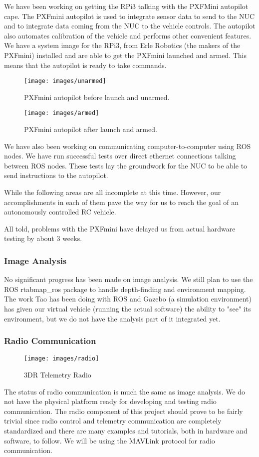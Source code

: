 \documentclass[compsoc,draftclsnofoot,onecolumn,10pt]{IEEEtran}
\begin{document}
We have been working on getting the RPi3 talking with the PXFMini autopilot cape. The PXFmini autopilot is used to integrate sensor data to send to the NUC and to integrate data coming from the NUC to the vehicle controls. The autopilot also automates calibration of the vehicle and performs other convenient features. We have a system image for the RPi3, from Erle Robotics (the makers of the PXFmini) installed and are able to get the PXFmini launched and armed. This means that the autopilot is ready to take commands.\par
\begin{figure}[H]
	\texttt{[image: images/unarmed]}
	\caption{PXFmini autopilot before launch and unarmed.}
\end{figure}

\begin{figure}[H]
	\texttt{[image: images/armed]}
	\caption{PXFmini autopilot after launch and armed.}
\end{figure}

We have also been working on communicating computer-to-computer using ROS nodes. We have run successful tests over direct ethernet connections talking between ROS nodes. These tests lay the groundwork for the NUC to be able to send instructions to the autopilot.\par

While the following areas are all incomplete at this time. However, our accomplishments in each of them pave the way for us to reach the goal of an autonomously controlled RC vehicle.\par

All told, problems with the PXFmini have delayed us from actual hardware testing by about 3 weeks.

\subsubsection{Image Analysis}
No significant progress has been made on image analysis. We still plan to use the ROS rtabmap\_ros package to handle depth-finding and environment mapping. The work Tao has been doing with ROS and Gazebo (a simulation environment) has given our virtual vehicle (running the actual software) the ability to "see" its environment, but we do not have the analysis part of it integrated yet.


\subsubsection{Radio Communication}
\begin{figure}[H]
	\texttt{[image: images/radio]}
	\caption{3DR Telemetry Radio}
\end{figure}
The status of radio communication is much the same as image analysis. We do not have the physical platform ready for developing and testing radio communication. The radio component of this project should prove to be fairly trivial since radio control and telemetry communication are completely standardized and there are many examples and tutorials, both in hardware and software, to follow. We will be using the MAVLink protocol for radio communication.
\end{document}

